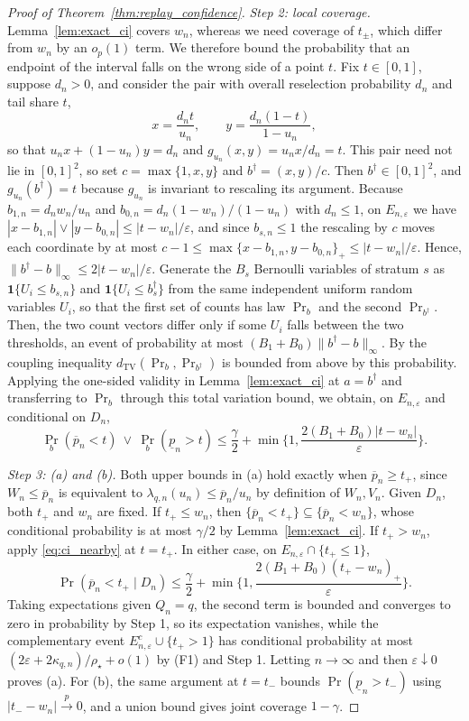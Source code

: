 \documentclass[10pt]{article}
\begin{document}
\begin{proof}[Proof of Theorem~\ref{thm:replay_confidence}]
\emph{Step 2: local coverage.}
Lemma~\ref{lem:exact_ci} covers $w_n$, whereas we need coverage of $t_\pm$, which differ from $w_n$ by an $o_p(1)$ term. We therefore bound the probability that an endpoint of the interval falls on the wrong side of a point $t$. Fix $t\in[0,1]$, suppose $d_n>0$, and consider the pair with overall reselection probability $d_n$ and tail share $t$,
\[
x=\frac{d_nt}{u_n},\qquad y=\frac{d_n(1-t)}{1-u_n},
\]
so that $u_nx+(1-u_n)y=d_n$ and $g_{u_n}(x,y)=u_nx/d_n=t$. This pair need not lie in $[0,1]^2$, so set $c=\max\{1,x,y\}$ and $b^\dagger=(x,y)/c$. Then $b^\dagger\in[0,1]^2$, and $g_{u_n}(b^\dagger)=t$ because $g_{u_n}$ is invariant to rescaling its argument. Because $b_{1,n}=d_nw_n/u_n$ and $b_{0,n}=d_n(1-w_n)/(1-u_n)$ with $d_n\le1$, on $E_{n,\varepsilon}$ we have $|x-b_{1,n}|\vee|y-b_{0,n}|\le|t-w_n|/\varepsilon$, and since $b_{s,n}\le1$ the rescaling by $c$ moves each coordinate by at most $c-1\le\max\{x-b_{1,n},y-b_{0,n}\}_+\le|t-w_n|/\varepsilon$. Hence, $\|b^\dagger-b\|_\infty\le2|t-w_n|/\varepsilon$. Generate the $B_s$ Bernoulli variables of stratum $s$ as $\mathbf 1\{U_i\le b_{s,n}\}$ and $\mathbf 1\{U_i\le b^\dagger_s\}$ from the same independent uniform random variables $U_i$, so that the first set of counts has law $\Pr_b$ and the second $\Pr_{b^\dagger}$. Then, the two count vectors differ only if some $U_i$ falls between the two thresholds, an event of probability at most $(B_1+B_0)\|b^\dagger-b\|_\infty$. By the coupling inequality $d_{\mathrm{TV}}(\Pr_b,\Pr_{b^\dagger})$ is bounded from above by this probability. Applying the one-sided validity in Lemma~\ref{lem:exact_ci} at $a=b^\dagger$ and transferring to $\Pr_b$ through this total variation bound, we obtain, on $E_{n,\varepsilon}$ and conditional on $D_n$,
\begin{equation}\label{eq:ci_nearby}
\Pr_b(\overline p_n<t)\ \vee\ \Pr_b(\underline p_n>t)
\le\frac{\gamma}{2}+\min\Big\{1,\frac{2(B_1+B_0)|t-w_n|}{\varepsilon}\Big\}.
\end{equation}

\emph{Step 3: (a) and (b).}
Both upper bounds in (a) hold exactly when $\overline p_n\ge t_+$, since $W_n\le\overline p_n$ is equivalent to $\lambda_{q,n}(u_n)\le\overline p_n/u_n$ by definition of $W_n, V_n$. Given $D_n$, both $t_+$ and $w_n$ are fixed. If $t_+\le w_n$, then $\{\overline p_n<t_+\}\subseteq\{\overline p_n<w_n\}$, whose conditional probability is at most $\gamma/2$ by Lemma~\ref{lem:exact_ci}. If $t_+>w_n$, apply \eqref{eq:ci_nearby} at $t=t_+$. In either case, on $E_{n,\varepsilon}\cap\{t_+\le1\}$,
\[
\Pr(\overline p_n<t_+\mid D_n)
\le\frac{\gamma}{2}+\min\Big\{1,\frac{2(B_1+B_0)(t_+-w_n)_+}{\varepsilon}\Big\}.
\]
Taking expectations given $Q_n=q$, the second term is bounded and converges to zero in probability by Step 1, so its expectation vanishes, while the complementary event $E_{n,\varepsilon}^c\cup\{t_+>1\}$ has conditional probability at most $(2\varepsilon+2\kappa_{q,n})/\rho_\star+o(1)$ by (F1) and Step 1. Letting $n\to\infty$ and then $\varepsilon\downarrow0$ proves (a). For (b), the same argument at $t=t_-$ bounds $\Pr(\underline p_n>t_-)$ using $|t_--w_n|\stackrel{p}{\longrightarrow}0$, and a union bound gives joint coverage $1-\gamma$.


\end{proof}
\end{document}
